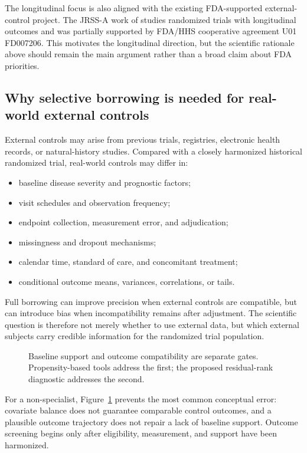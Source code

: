 \documentclass[11pt]{article}
\newcommand{\fullfig}[1]{\resizebox{\linewidth}{!}{}}
\begin{document}
The longitudinal focus is also aligned with the existing FDA-supported external-control project. The JRSS-A work of \citet{zhou2025causal} studies randomized trials with longitudinal outcomes and was partially supported by FDA/HHS cooperative agreement U01 FD007206. This motivates the longitudinal direction, but the scientific rationale above should remain the main argument rather than a broad claim about FDA priorities.

\subsection{Why selective borrowing is needed for real-world external controls}

External controls may arise from previous trials, registries, electronic health records, or natural-history studies. Compared with a closely harmonized historical randomized trial, real-world controls may differ in:
\begin{itemize}
    \item baseline disease severity and prognostic factors;
    \item visit schedules and observation frequency;
    \item endpoint collection, measurement error, and adjudication;
    \item missingness and dropout mechanisms;
    \item calendar time, standard of care, and concomitant treatment;
    \item conditional outcome means, variances, correlations, or tails.
\end{itemize}

Full borrowing can improve precision when external controls are compatible, but can introduce bias when incompatibility remains after adjustment. The scientific question is therefore not merely whether to use external data, but which external subjects carry credible information for the randomized trial population.

\begin{figure}[!ht]
\centering
\fullfig{two_gates.tex}
\caption{Baseline support and outcome compatibility are separate gates. Propensity-based tools address the first; the proposed residual-rank diagnostic addresses the second.}
\label{fig:two-gates}
\end{figure}

For a non-specialist, Figure~\ref{fig:two-gates} prevents the most common conceptual error: covariate balance does not guarantee comparable control outcomes, and a plausible outcome trajectory does not repair a lack of baseline support. Outcome screening begins only after eligibility, measurement, and support have been harmonized.
\end{document}
